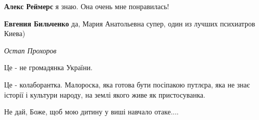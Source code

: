 \begin{itemize}
\begin{itemize}
\textbf{Алекс Реймерс} я знаю. Она очень мне понравилась!

 
\textbf{Евгения Бильченко} да, Мария Анатольевна супер, один из лучших психиатров Киева)
\end{itemize}

\emph{Остап Прохоров}

Це - не громадянка України.

Це - колаборантка. Малороска, яка готова бути посіпакою путлєра, яка не знає
історії і культури народу, на землі якого живе як пристосуванка.

Не дай, Боже, щоб мою дитину у виші навчало отаке....


\end{itemize}

